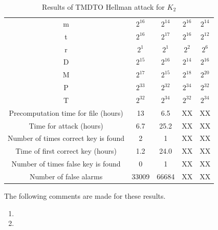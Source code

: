 \begin{table}[ht!]
\begin{center}
\begin{tabular}{|c||c|c|c|c|}
\hline
m																				&	$2^{16}$ 	&	$2^{14}$ 	&	$2^{16}$ 	&	$2^{14}$ 	\\ 
t	  																		&	$2^{16}$ 	&	$2^{17}$ 	&	$2^{16}$ 	&	$2^{12}$	\\ 
r	  																		&	$2^{1}$ 	&	$2^{1}$ 	&	$2^{2}$ 	&	$2^{6}$		\\ 
D	  																		&	$2^{15}$ 	&	$2^{16}$ 	&	$2^{14}$ 	&	$2^{16}$	\\ \hline \hline
M																				&	$2^{17}$ 	&	$2^{15}$ 	&	$2^{18}$ 	&	$2^{20}$ 	\\ 
P	  																		&	$2^{33}$ 	&	$2^{32}$ 	&	$2^{34}$ 	&	$2^{32}$	\\ 
T	  																		&	$2^{32}$ 	&	$2^{34}$ 	&	$2^{32}$ 	&	$2^{34}$	\\ \hline \hline
Precomputation time for file (hours)		&	13 	 			&	6.5 			&	XX				&	XX				\\ \hline
Time for attack	(hours)									&	6.7 			&	25.2			&	XX 			 	&	XX	 			\\ \hline
Number of times correct key is found 		&	2 				&	1					&	XX 				&	XX 				\\ \hline
Time of first correct key (hours)				&	1.2 			&	24.0			&	XX	 		 	&	XX	 			\\ \hline
Number of times false key is found			&	0 				&	1 				&	XX				&	XX				\\ \hline
Number of false alarms									&	33009			&	66684			&	XX				&	XX				\\ \hline
\end{tabular}
\end{center}
\caption{Results of TMDTO Hellman attack for $K_2$}
\label{tab:hellman-attack-results}
\end{table}

The following comments are made for these results.
\begin{enumerate}
\item 
\item 
\end{enumerate}